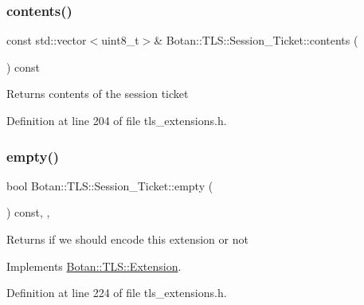 \subsubsection{\texorpdfstring{contents()}{contents()}}
{\footnotesize\ttfamily const std\+::vector$<$uint8\+\_\+t$>$\& Botan\+::\+T\+L\+S\+::\+Session\+\_\+\+Ticket\+::contents (\begin{DoxyParamCaption}{ }\end{DoxyParamCaption}) const\hspace{0.3cm}{\ttfamily [inline]}}

\begin{DoxyReturn}{Returns}
contents of the session ticket 
\end{DoxyReturn}


Definition at line 204 of file tls\+\_\+extensions.\+h.

\mbox{\label{class_botan_1_1_t_l_s_1_1_session___ticket_a6796d47c184b69f1eaf5bcee582a4ebe}} 
\subsubsection{\texorpdfstring{empty()}{empty()}}
{\footnotesize\ttfamily bool Botan\+::\+T\+L\+S\+::\+Session\+\_\+\+Ticket\+::empty (\begin{DoxyParamCaption}{ }\end{DoxyParamCaption}) const\hspace{0.3cm}{\ttfamily [inline]}, {\ttfamily [override]}, {\ttfamily [virtual]}}

\begin{DoxyReturn}{Returns}
if we should encode this extension or not 
\end{DoxyReturn}


Implements \mbox{\hyperlink{class_botan_1_1_t_l_s_1_1_extension_aa850b9be2322f94e7c65e583cd51acc5}{Botan\+::\+T\+L\+S\+::\+Extension}}.



Definition at line 224 of file tls\+\_\+extensions.\+h.

\mbox{\label{class_botan_1_1_t_l_s_1_1_session___ticket_a446a320f05bfc710740defcd5ac0ca58}} 
